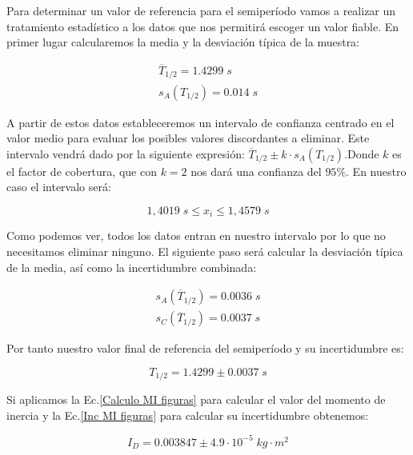\documentclass[a4paper,12pt,titlepage]{article}
\begin{document}
Para determinar un valor de referencia para el semiperíodo vamos a realizar un tratamiento estadístico a los datos que nos permitirá escoger un valor fiable. En primer lugar calcularemos la media y la desviación típica de la muestra:

\begin{equation}
    \begin{gathered}
        \overline{T}_{1/2} = 1.4299 \; s\\
        s_A(T_{1/2}) = 0.014 \; s
    \end{gathered}
\end{equation}

A partir de estos datos estableceremos un intervalo de confianza centrado en el valor medio para evaluar los posibles valores discordantes a eliminar. Este intervalo vendrá dado por la siguiente expresión: $\overline{T}_{1/2} \pm k\cdot s_A(T_{1/2})$.Donde $k$ es el factor de cobertura, que con $k=2$ nos dará una confianza del $95\%$. En nuestro caso el intervalo será:

\begin{equation}
    1,4019 \; s \leq x_i \leq 1,4579 \; s
\end{equation}

Como podemos ver, todos los datos entran en nuestro intervalo por lo que no necesitamos eliminar ninguno. El siguiente paso será calcular la desviación típica de la media, así como la incertidumbre combinada:

\begin{equation}
    \begin{gathered}
        s_A(\overline{T}_{1/2}) = 0.0036 \; s\\
        s_C(\overline{T}_{1/2}) = 0.0037 \; s
    \end{gathered}
\end{equation}

Por tanto nuestro valor final de referencia del semiperíodo y su incertidumbre es:

\begin{equation}
    T_{1/2} = 1.4299 \pm 0.0037 \; s
\end{equation}

Si aplicamos la Ec.\ref{Calculo MI figuras} para calcular el valor del momento de inercia y la Ec.\ref{Inc MI figuras} para calcular su incertidumbre obtenemos:

\begin{equation}
    I_D = 0.003847 \pm 4.9 \cdot 10^{-5} \; kg\cdot m^2
\end{equation}
\end{document}
